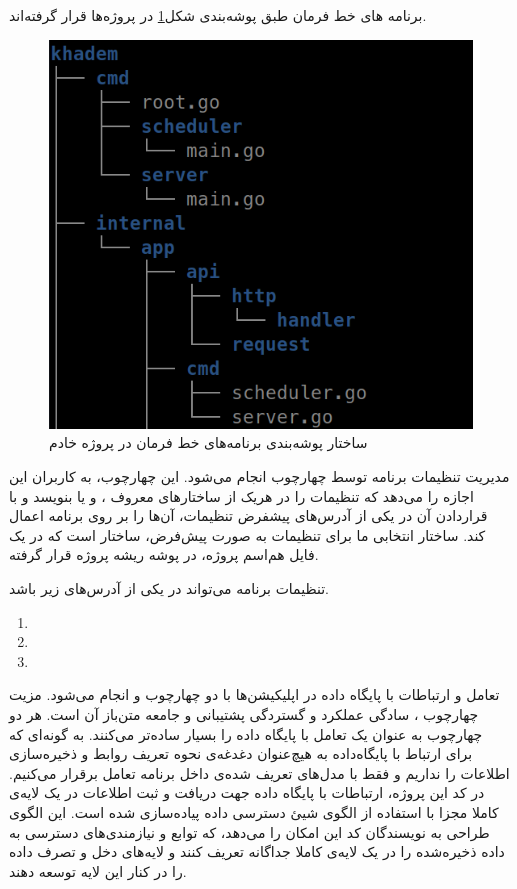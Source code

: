 برنامه ‌های خط فرمان طبق پوشه‌بندی شکل\ref{fig:cobra-dir} در پروژه‌ها قرار گرفته‌اند.

\begin{figure}
	\vspace{1cm}
	\centering
	\includegraphics[scale=0.45]{figures/cobra-dir.png}
	\caption{ساختار پوشه‌بندی برنامه‌های خط فرمان در پروژه خادم}
	\label{fig:cobra-dir}
\end{figure}

مدیریت تنظیمات برنامه توسط چهارچوب  انجام می‌شود. این چهارچوب، به کاربران این اجازه را می‌دهد که تنظیمات را در هر‌یک از ساختارهای معروف ،  و یا  بنویسد و با قراردادن آن در یکی از آدرس‌های پیشفرض تنظیمات، آن‌ها را بر روی برنامه اعمال کند. ساختار انتخابی ما برای تنظیمات به صورت پیش‌فرض، ساختار  است که در یک فایل هم‌اسم پروژه، در پوشه ریشه پروژه قرار گرفته.

تنظیمات برنامه می‌تواند در یکی از آدرس‌های زیر باشد.
\begin{enumerate}
	\item {}
	\item {}
	\item {}
\end{enumerate}


تعامل و ارتباطات با پایگاه داده در اپلیکیشن‌ها با دو چهارچوب  و  انجام می‌شود. مزیت چهارچوب ، سادگی عملکرد و گستردگی پشتیبانی و جامعه متن‌باز آن است. هر دو چهارچوب به عنوان یک  تعامل با پایگاه داده را بسیار ساده‌تر می‌کنند. به گونه‌ای که برای ارتباط با پایگاه‌داده به هیچ‌عنوان دغدغه‌ی نحوه تعریف روابط و ذخیره‌سازی اطلاعات را نداریم و فقط با مدل‌های تعریف شده‌ی داخل برنامه تعامل برقرار می‌کنیم. در کد این پروژه، ارتباطات با پایگاه داده جهت دریافت و ثبت اطلاعات در یک لایه‌ی کاملا مجزا با استفاده از الگوی شیئ دسترسی داده پیاده‌سازی شده است. این الگوی طراحی به نویسندگان کد این امکان را می‌‌دهد، که توابع و نیازمندی‌های دسترسی به داده ذخیره‌شده را در یک لایه‌ی کاملا جداگانه تعریف کنند و لایه‌های دخل و تصرف داده را در کنار این لایه توسعه دهند\cite{oracle_dao}.

